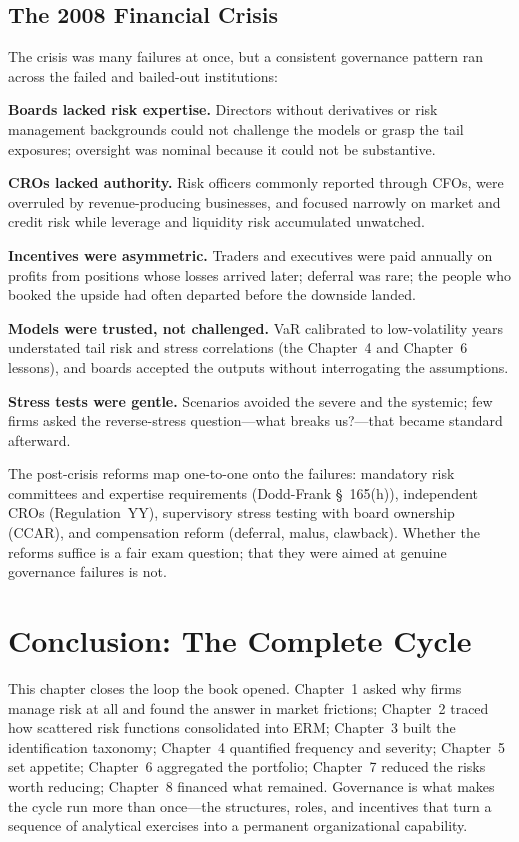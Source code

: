 \documentclass[11pt,openany]{book}
\begin{document}
\subsection{The 2008 Financial Crisis}

The crisis was many failures at once, but a consistent governance pattern ran
across the failed and bailed-out institutions:

\textbf{Boards lacked risk expertise.} Directors without derivatives or risk
management backgrounds could not challenge the models or grasp the tail
exposures; oversight was nominal because it could not be substantive.

\textbf{CROs lacked authority.} Risk officers commonly reported through CFOs,
were overruled by revenue-producing businesses, and focused narrowly on
market and credit risk while leverage and liquidity risk accumulated
unwatched.

\textbf{Incentives were asymmetric.} Traders and executives were paid
annually on profits from positions whose losses arrived later; deferral was
rare; the people who booked the upside had often departed before the downside
landed.

\textbf{Models were trusted, not challenged.} VaR calibrated to
low-volatility years understated tail risk and stress correlations (the
Chapter~4 and Chapter~6 lessons), and boards accepted the outputs without
interrogating the assumptions.

\textbf{Stress tests were gentle.} Scenarios avoided the severe and the
systemic; few firms asked the reverse-stress question---what breaks
us?---that became standard afterward.

The post-crisis reforms map one-to-one onto the failures: mandatory risk
committees and expertise requirements (Dodd-Frank \S~165(h)), independent
CROs (Regulation~YY), supervisory stress testing with board ownership
(CCAR), and compensation reform (deferral, malus, clawback). Whether the
reforms suffice is a fair exam question; that they were aimed at genuine
governance failures is not.

\section{Conclusion: The Complete Cycle}
\label{sec:conclusion}

This chapter closes the loop the book opened. Chapter~1 asked why firms
manage risk at all and found the answer in market frictions; Chapter~2 traced
how scattered risk functions consolidated into ERM; Chapter~3 built the
identification taxonomy; Chapter~4 quantified frequency and severity;
Chapter~5 set appetite; Chapter~6 aggregated the portfolio; Chapter~7 reduced
the risks worth reducing; Chapter~8 financed what remained. Governance is
what makes the cycle run more than once---the structures, roles, and
incentives that turn a sequence of analytical exercises into a permanent
organizational capability.
\end{document}
